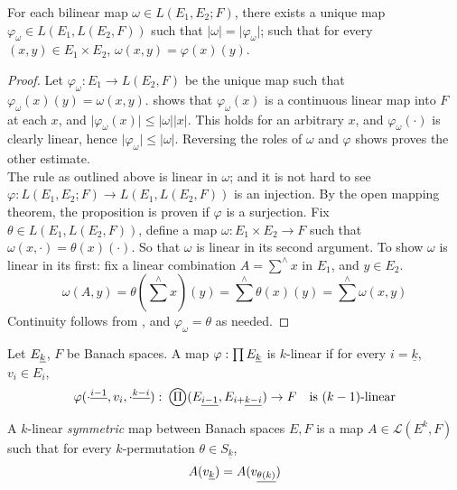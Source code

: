 \documentclass[../main-v2-manifolds.tex]{subfiles}
\begin{document}
\begin{wts}[$L(E_1,E_2;F)$ is isomorphic to $L(E_1, L(E_2,F))$]\label{prop:bilinear-map-isomorphism-currying}
    For each bilinear map $\omega\in L(E_1,E_2;F)$, there exists a unique map $\varphi_\omega\in L(E_1, L(E_2,F))$ such that $\vert \omega\vert = \vert\varphi_\omega\vert$; such that for every $(x,y)\in E_1\times E_2$, $\omega(x,y) = \varphi(x)(y)$.
\end{wts}
\begin{proof}
    Let $\varphi_\omega: E_1\to L(E_2,F)$ be the unique map such that $\varphi_\omega(x)(y) = \omega(x,y)$.  shows that $\varphi_\omega(x)$ is a continuous linear map into $F$ at each $x$, and $\vert\varphi_\omega(x)\vert\leq\vert\omega\vert\vert x\vert$. This holds for an arbitrary $x$, and $\varphi_{\omega}(\cdot)$ is clearly linear, hence $\vert\varphi_\omega\vert\leq\vert\omega\vert$. Reversing the roles of $\omega$ and $\varphi$ shows proves the other estimate.\\

    The rule as outlined above is linear in $\omega$; and it is not hard to see $\varphi: L(E_1,E_2; F)\to L(E_1, L(E_2, F))$ is an injection. By the open mapping theorem, the proposition is proven if $\varphi$ is a surjection. Fix $\theta\in L(E_1, L(E_2,F))$, define a map $\omega: E_1\times E_2\to F$ such that $\omega(x,\cdot) = \theta(x)(\cdot)$. So that $\omega$ is linear in its second argument. To show $\omega$ is linear in its first: fix a linear combination $A = \sum^\wedge x$ in $E_1$, and $y\in E_2$. 
    \[
    \omega(A,y) =\theta(\sum^\wedge x)(y) = \sum^\wedge \theta(x)(y) = \sum^\wedge \omega(x,y)
    \]
    Continuity follows from , and $\varphi_\omega = \theta$ as needed.
\end{proof}

\begin{definition}\label{def:k-linear-maps}
    Let $\UL{E}[k]$, $F$ be Banach spaces. A map $\varphi: \prod \UL{E}[k]$ is $k$-linear if for every $i=\underline{k}$, $v_i\in E_i$, 
    \[
        \varphi(\UPL{\cdot}[i-1],v_i,\UPL{\cdot}[k-i]):\: \bigoprod (\UL{E}[i-1],\UL{E}[i+][k-i])\to F\quad\text{is }(k-1)\text{-linear}
    \]
\end{definition}
A $k$-linear \emph{symmetric} map between Banach spaces $E,F$ is a map $A\in \mathcal{L}(E^k,F)$ such that for every $k$-permutation $\theta\in S_{\underline{k}}$, 
\[
    A(\Ul{v}[k]) = A(\Ul{v}[\theta(k)])    
\]
\end{document}
